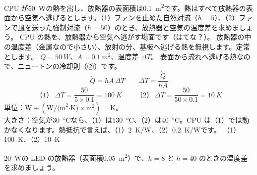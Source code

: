\label{ph:熱-12:ex1}
\begin{phreidai}
CPU が\qty{50}{W}の熱を出し、放熱器の表面積は\qty{0.1}{m^2}です。熱はすべて放熱器の表面から空気へ逃げるとします。（1）ファンを止めた自然対流（$h=5$）、（2）ファンで風を送った強制対流（$h=50$）のとき、放熱器と空気の温度差を求めましょう。
\phbamen
CPU の熱を、放熱器から空気へ逃がす場面です（はてな？）。
\phmushi
放熱器の中の温度差（金属なので小さい）、放射の分、基板へ逃げる熱を無視します。定常とします。
\phzu
$\dot Q=\qty{50}{W}$、$A=\qty{0.1}{m^2}$、温度差 $\Delta T$。
\phriyu
表面から流れへ逃げる熱なので、ニュートンの冷却則（②）です。
\phtateru
\[\dot Q=hA\,\Delta T\qquad\Delta T=\frac{\dot Q}{hA}\]
\phtoku
\[（1）\ \Delta T=\frac{50}{5\times0.1}=\qty{100}{K}\qquad（2）\ \Delta T=\frac{50}{50\times0.1}=\qty{10}{K}\]
\phtashikame
単位：$\text{W}\div(\text{W/(m}^2\text{·K)}\times\text{m}^2)=\text{K}$。\\
大きさ：空気が\qty{30}{\celsius}なら、（1）は\qty{130}{\celsius}、（2）は\qty{40}{\celsius}。CPU は（1）では動かなくなります。熱抵抗で言えば、（1）\qty{2}{K/W}、（2）\qty{0.2}{K/W}です。
\kotae （1）\qty{100}{K}、（2）\qty{10}{K}
\end{phreidai}
\begin{jibun}
\qty{20}{W}の LED の放熱器（表面積\qty{0.05}{m^2}）で、$h=8$ と $h=40$ のときの温度差を求めましょう。
\end{jibun}

